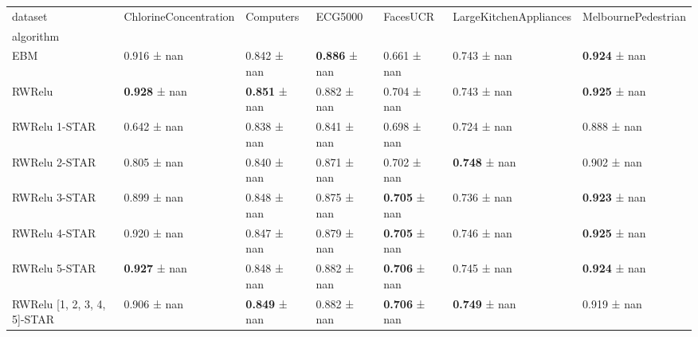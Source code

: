 \begin{tabular}{lllllll}
\toprule
dataset & ChlorineConcentration & Computers & ECG5000 & FacesUCR & LargeKitchenAppliances & MelbournePedestrian \\
algorithm &  &  &  &  &  &  \\
\midrule
EBM & 0.916 ± nan & 0.842 ± nan & \textbf{0.886} ± nan & 0.661 ± nan & 0.743 ± nan & \textbf{0.924} ± nan \\
RWRelu & \textbf{0.928} ± nan & \textbf{0.851} ± nan & 0.882 ± nan & 0.704 ± nan & 0.743 ± nan & \textbf{0.925} ± nan \\
RWRelu 1-STAR & 0.642 ± nan & 0.838 ± nan & 0.841 ± nan & 0.698 ± nan & 0.724 ± nan & 0.888 ± nan \\
RWRelu 2-STAR & 0.805 ± nan & 0.840 ± nan & 0.871 ± nan & 0.702 ± nan & \textbf{0.748} ± nan & 0.902 ± nan \\
RWRelu 3-STAR & 0.899 ± nan & 0.848 ± nan & 0.875 ± nan & \textbf{0.705} ± nan & 0.736 ± nan & \textbf{0.923} ± nan \\
RWRelu 4-STAR & 0.920 ± nan & 0.847 ± nan & 0.879 ± nan & \textbf{0.705} ± nan & 0.746 ± nan & \textbf{0.925} ± nan \\
RWRelu 5-STAR & \textbf{0.927} ± nan & 0.848 ± nan & 0.882 ± nan & \textbf{0.706} ± nan & 0.745 ± nan & \textbf{0.924} ± nan \\
RWRelu [1, 2, 3, 4, 5]-STAR & 0.906 ± nan & \textbf{0.849} ± nan & 0.882 ± nan & \textbf{0.706} ± nan & \textbf{0.749} ± nan & 0.919 ± nan \\
\bottomrule
\end{tabular}
